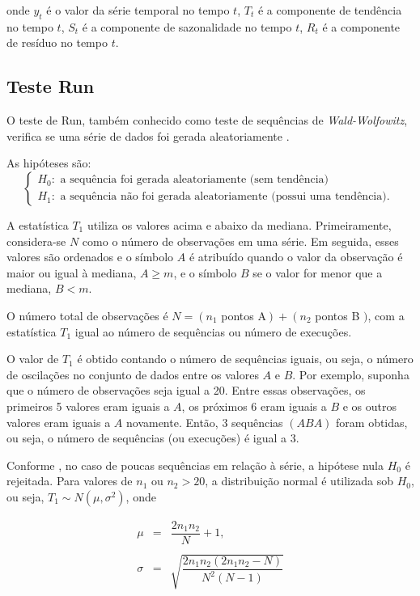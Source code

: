 \noindent onde $y_t$ é o valor da série temporal no tempo $t$, $T_t$ é a componente de tendência no tempo $t$, $S_t$ é a componente de sazonalidade no tempo $t$, $R_t$ é a componente de resíduo no tempo $t$.

\subsection{Teste Run}

O teste de Run, também conhecido como teste de sequências de \textit{Wald-Wolfowitz}, verifica se uma série de dados foi gerada aleatoriamente \cite{PAIVA}.

As hipóteses são:
$$
\left\{\begin{array}{l}
	H_0: \text { a sequência foi gerada aleatoriamente (sem tendência) } \\
	H_1: \text { a sequência não foi gerada aleatoriamente (possui uma tendência). }
\end{array}\right.
$$

A estatística $T_1$ utiliza os valores acima e abaixo da mediana. Primeiramente, considera-se $N$ como o número de observações em uma série. Em seguida, esses valores são ordenados e o símbolo $A$ é atribuído quando o valor da observação é maior ou igual à mediana, $A \geq m$, e o símbolo $B$ se o valor for menor que a mediana, $B<m$.

O número total de observações é $N=\left(n_1\right.$ pontos $\left.\mathrm{A}\right)+\left(n_2\right.$ pontos B $)$, com a estatística $T_1$ igual ao número de sequências ou número de execuções.

O valor de $T_1$ é obtido contando o número de sequências iguais, ou seja, o número de oscilações no conjunto de dados entre os valores $A$ e $B$. Por exemplo, suponha que o número de observações seja igual a 20. Entre essas observações, os primeiros 5 valores eram iguais a $A$, os próximos 6 eram iguais a $B$ e os outros valores eram iguais a $A$ novamente. Então, 3 sequências $(A B A)$ foram obtidas, ou seja, o número de sequências (ou execuções) é igual a 3.

Conforme , no caso de poucas sequências em relação à série, a hipótese nula $H_0$ é rejeitada. Para valores de $n_1$ ou $n_2>20$, a distribuição normal é utilizada sob $H_0$, ou seja, $T_1 \sim N\left(\mu, \sigma^2\right)$, onde

\begin{eqnarray}
	\mu&=&\dfrac{2 n_1 n_2}{N}+1, \\
	\nonumber\\
	 \sigma&=&\sqrt{\dfrac{2 n_1 n_2\left(2 n_1 n_2-N\right)}{N^2(N-1)}} 
\end{eqnarray}


